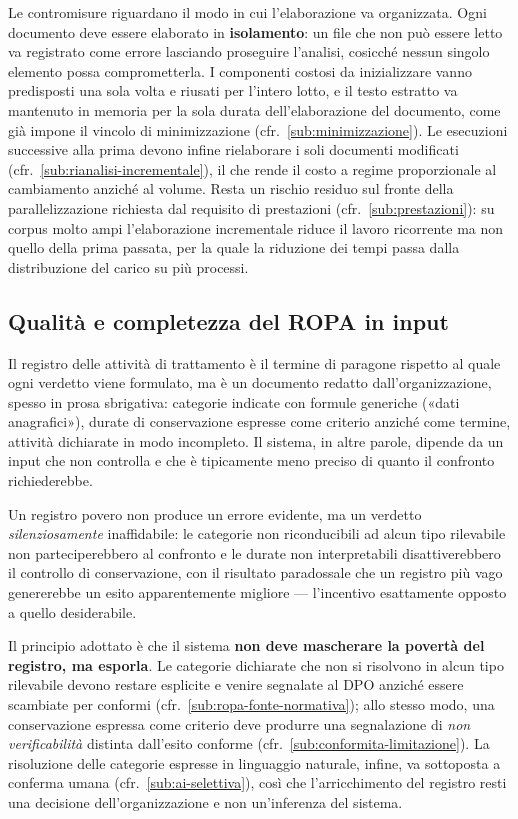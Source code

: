 Le contromisure riguardano il modo in cui l'elaborazione va organizzata. Ogni documento deve essere elaborato in \textbf{isolamento}: un file che non può essere letto va registrato come errore lasciando proseguire l'analisi, cosicché nessun singolo elemento possa comprometterla. I componenti costosi da inizializzare vanno predisposti una sola volta e riusati per l'intero lotto, e il testo estratto va mantenuto in memoria per la sola durata dell'elaborazione del documento, come già impone il vincolo di minimizzazione (cfr.~\ref{sub:minimizzazione}). Le esecuzioni successive alla prima devono infine rielaborare i soli documenti modificati (cfr.~\ref{sub:rianalisi-incrementale}), il che rende il costo a regime proporzionale al cambiamento anziché al volume. Resta un rischio residuo sul fronte della parallelizzazione richiesta dal requisito di prestazioni (cfr.~\ref{sub:prestazioni}): su corpus molto ampi l'elaborazione incrementale riduce il lavoro ricorrente ma non quello della prima passata, per la quale la riduzione dei tempi passa dalla distribuzione del carico su più processi.

\subsection{Qualità e completezza del ROPA in input}
\label{sub:rischio-qualita-ropa}
Il registro delle attività di trattamento è il termine di paragone rispetto al quale ogni verdetto viene formulato, ma è un documento redatto dall'organizzazione, spesso in prosa sbrigativa: categorie indicate con formule generiche («dati anagrafici»), durate di conservazione espresse come criterio anziché come termine, attività dichiarate in modo incompleto. Il sistema, in altre parole, dipende da un input che non controlla e che è tipicamente meno preciso di quanto il confronto richiederebbe. \medskip

Un registro povero non produce un errore evidente, ma un verdetto \emph{silenziosamente} inaffidabile: le categorie non riconducibili ad alcun tipo rilevabile non parteciperebbero al confronto e le durate non interpretabili disattiverebbero il controllo di conservazione, con il risultato paradossale che un registro più vago genererebbe un esito apparentemente migliore --- l'incentivo esattamente opposto a quello desiderabile. \medskip

Il principio adottato è che il sistema \textbf{non deve mascherare la povertà del registro, ma esporla}. Le categorie dichiarate che non si risolvono in alcun tipo rilevabile devono restare esplicite e venire segnalate al DPO anziché essere scambiate per conformi (cfr.~\ref{sub:ropa-fonte-normativa}); allo stesso modo, una conservazione espressa come criterio deve produrre una segnalazione di \emph{non verificabilità} distinta dall'esito conforme (cfr.~\ref{sub:conformita-limitazione}). La risoluzione delle categorie espresse in linguaggio naturale, infine, va sottoposta a conferma umana (cfr.~\ref{sub:ai-selettiva}), così che l'arricchimento del registro resti una decisione dell'organizzazione e non un'inferenza del sistema.

